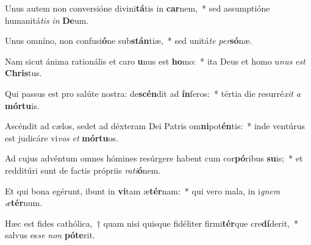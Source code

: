 \item Unus autem non conversióne divini\textbf{tá}tis in \textbf{car}nem,~* sed assumptióne humanitá\textit{tis} \textit{in} \textbf{De}um.
\item Unus omníno, non confusi\textbf{ó}ne sub\textbf{stán}tiæ,~* sed unitá\textit{te} \textit{per}\textbf{só}næ.
\item Nam sicut ánima rationális et caro \textbf{u}nus est \textbf{ho}mo:~* ita Deus et homo u\textit{nus} \textit{est} \textbf{Chris}tus.
\item Qui passus est pro salúte nostra: de\textbf{scén}dit ad \textbf{ín}feros:~* tértia die resurré\textit{xit} \textit{a} \textbf{mór}\textbf{tu}is.
\item Ascéndit ad cælos, sedet ad déxteram Dei Patris om\textbf{ni}pot\textbf{én}tis:~* inde ventúrus est judicáre vi\textit{vos} \textit{et} \textbf{mór}\textbf{tu}os.
\item Ad cujus advéntum omnes hómines resúrgere habent cum cor\textbf{pó}ribus \textbf{su}is;~* et redditúri sunt de factis própriis \textit{ra}\textit{ti}\textbf{ó}nem.
\item Et qui bona egérunt, ibunt in \textbf{vi}tam æ\textbf{tér}nam:~* qui vero mala, in i\textit{gnem} \textit{æ}\textbf{tér}num.
\item Hæc est fides cathólica,~† quam nisi quisque fidéliter firmi\textbf{tér}que cre\textbf{dí}derit,~* salvus es\textit{se} \textit{non} \textbf{pót}\textbf{e}rit.
